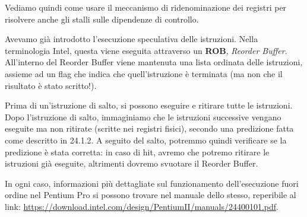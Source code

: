 \documentclass[a4paper,11pt]{article}
\begin{document}
Vediamo quindi come usare il meccanismo di ridenominazione dei registri per risolvere anche gli stalli sulle dipendenze di controllo.

Avevamo già introdotto l'esecuzione speculativa delle istruzioni.
Nella terminologia Intel, questa viene eseguita attraverso un \textbf{ROB}, \textit{Reorder Buffer}.
All'interno del Reorder Buffer viene mantenuta una lista ordinata delle istruzioni, assieme ad un flag che indica che quell'istruzione è terminata (ma non che il risultato è stato scritto!).

Prima di un'istruzione di salto, si possono eseguire e ritirare tutte le istruzioni.
Dopo l'istruzione di salto, immaginiamo che le istruzioni successive vengano eseguite ma non ritirate (scritte nei registri fisici), secondo una predizione fatta come descritto in 24.1.2.
A seguito del salto, potremmo quindi verificare se la predizione è stata corretta: in caso di hit, avremo che potremo ritirare le istruzioni già eseguite, altrimenti dovremo svuotare il Reorder Buffer.

In ogni caso, informazioni più dettagliate sul funzionamento dell'esecuzione fuori ordine nel Pentium Pro si possono trovare nel manuale dello stesso, reperibile al link: \url{https://download.intel.com/design/PentiumII/manuals/24400101.pdf}.

\newpage
\end{document}
